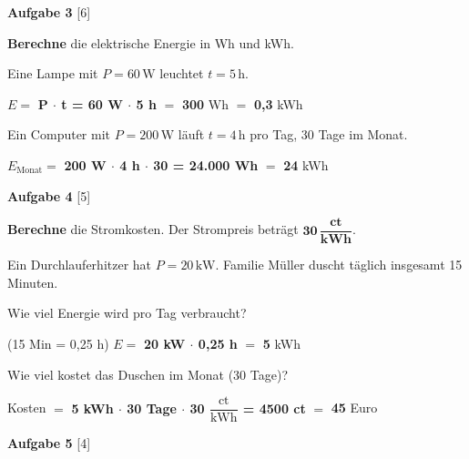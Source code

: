 \documentclass[11pt, a4paper]{article}
\newif\ifzeigesternchen
\newcommand{\lsg}[1]{\textcolor{loesung}{\textbf{#1}}}
\newcommand{\punktebox}[1]{\hfill\small\textcolor{mittelgrau}{[#1]}}
\newcommand{\stern}[1]{\ifzeigesternchen\textsuperscript{\textcolor{fachfarbe}{(#1)}}\fi}
\newcommand{\aufgabe}[2]{%
    \needspace{4\baselineskip}%
    \vspace{10pt}%
    \noindent\textbf{\textcolor{fachfarbe}{Aufgabe #1}} #2%
    \vspace{4pt}%
    \nopagebreak[4]%
}
\newcommand{\operator}[1]{\textbf{\textcolor{fachfarbe}{#1}}}
\newcommand{\ein}[1]{\,\mathrm{#1}}
\begin{document}
\aufgabe{3}{\stern{**}} \punktebox{6}

\operator{Berechne} die elektrische Energie in Wh und kWh.

\begin{teil}
    \item Eine Lampe mit $P = 60\ein{W}$ leuchtet $t = 5\ein{h}$.

    \vspace{2em}
    $E = $ \lsg{P $\cdot$ t = 60 W $\cdot$ 5 h} $= $ \lsg{300} Wh $= $ \lsg{0,3} kWh

    \item Ein Computer mit $P = 200\ein{W}$ läuft $t = 4\ein{h}$ pro Tag, 30 Tage im Monat.

    \vspace{2.5em}
    $E_{\text{Monat}} = $ \lsg{200 W $\cdot$ 4 h $\cdot$ 30 = 24.000 Wh} $= $ \lsg{24} kWh
\end{teil}


\aufgabe{4}{\stern{**}} \punktebox{5}

\operator{Berechne} die Stromkosten. Der Strompreis beträgt $\mathbf{30\,\dfrac{ct}{kWh}}$.

\vspace{0.3em}
Ein Durchlauferhitzer hat $P = 20\ein{kW}$. Familie Müller duscht täglich insgesamt 15 Minuten.

\begin{teil}
    \item Wie viel Energie wird pro Tag verbraucht?

    \textcolor{loesung}{\small (15 Min = 0,25 h)}
    \vspace{1em}
    $E = $ \lsg{20 kW $\cdot$ 0,25 h} $= $ \lsg{5} kWh

    \item Wie viel kostet das Duschen im Monat (30 Tage)?

    \vspace{2em}
    Kosten $= $ \lsg{5 kWh $\cdot$ 30 Tage $\cdot$ 30 $\dfrac{\text{ct}}{\text{kWh}}$ = 4500 ct} $= $ \lsg{45} Euro
\end{teil}


\aufgabe{5}{\stern{***}} \punktebox{4}
\end{document}
